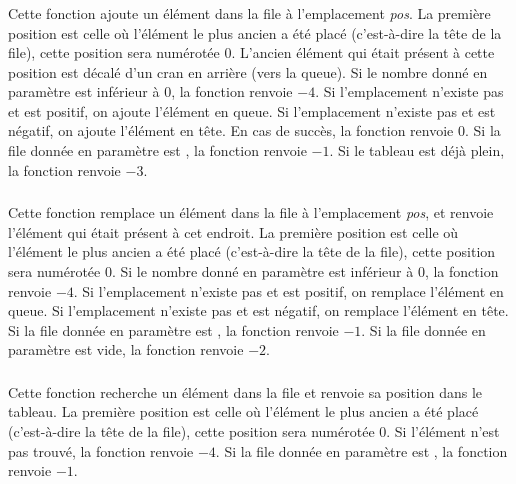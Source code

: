 \subsubsection*{}

\noindent Cette fonction ajoute un élément dans la file à l'emplacement \textit{pos}.
La première position est celle où l'élément le plus ancien a été placé (c'est-à-dire la tête de la file), cette position sera numérotée $ 0 $.
L'ancien élément qui était présent à cette position est décalé d'un cran en arrière (vers la queue).
Si le nombre donné en paramètre est inférieur à $ 0 $, la fonction renvoie $ -4 $.
Si l'emplacement n'existe pas et est positif, on ajoute l'élément en queue.
Si l'emplacement n'existe pas et est négatif, on ajoute l'élément en tête.
En cas de succès, la fonction renvoie $ 0 $.
Si la file donnée en paramètre est , la fonction renvoie $ -1 $.
Si le tableau est déjà plein, la fonction renvoie $ -3 $.


\subsubsection*{}

\noindent Cette fonction remplace un élément dans la file à l'emplacement \textit{pos}, et renvoie l'élément qui était présent à cet endroit.
La première position est celle où l'élément le plus ancien a été placé (c'est-à-dire la tête de la file), cette position sera numérotée $ 0 $.
Si le nombre donné en paramètre est inférieur à $ 0 $, la fonction renvoie $ -4 $.
Si l'emplacement n'existe pas et est positif, on remplace l'élément en queue.
Si l'emplacement n'existe pas et est négatif, on remplace l'élément en tête.
Si la file donnée en paramètre est , la fonction renvoie $ -1 $.
Si la file donnée en paramètre est vide, la fonction renvoie $ -2 $.


\subsubsection*{}

\noindent Cette fonction recherche un élément dans la file et renvoie sa position dans le tableau.
La première position est celle où l'élément le plus ancien a été placé (c'est-à-dire la tête de la file), cette position sera numérotée $ 0 $.
Si l'élément n'est pas trouvé, la fonction renvoie $ -4 $.
Si la file donnée en paramètre est , la fonction renvoie $ -1 $.


